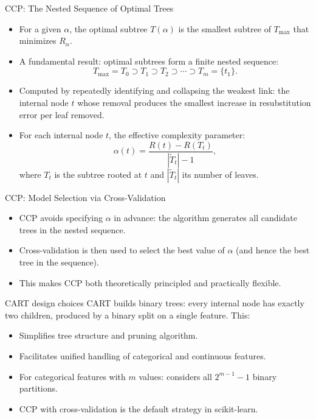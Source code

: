 \begin{frame}{CCP: The Nested Sequence of Optimal Trees}
  \begin{itemize}
    \item For a given $\alpha$, the optimal subtree $T(\alpha)$ is the smallest subtree of
          $T_{\max}$ that minimizes $R_\alpha$.
    \item A fundamental result: optimal subtrees form a finite \alert{nested sequence}:
    \[
      T_{\max} = T_0 \supset T_1 \supset T_2 \supset \cdots \supset T_m = \{t_1\}.
    \]
    \item Computed by repeatedly identifying and collapsing the \alert{weakest link}: the internal
          node $t$ whose removal produces the smallest increase in resubstitution error per leaf removed.
    \item For each internal node $t$, the \alert{effective complexity parameter}:
    \[
      \alpha(t) = \frac{R(t) - R(T_t)}{|\tilde{T}_t| - 1},
    \]
    where $T_t$ is the subtree rooted at $t$ and $|\tilde{T}_t|$ its number of leaves.
  \end{itemize}
\end{frame}

\begin{frame}{CCP: Model Selection via Cross-Validation}
  \begin{itemize}
    \item CCP \alert{avoids specifying $\alpha$ in advance}: the algorithm generates all candidate
          trees in the nested sequence.
    \item \alert{Cross-validation} is then used to select the best value of $\alpha$ (and hence the
          best tree in the sequence).
    \item This makes CCP both \alert{theoretically principled} and \alert{practically flexible}.
  \end{itemize}
  \begin{block}{CART design choices}
    CART builds \alert{binary trees}: every internal node has exactly two children, produced by a
    binary split on a single feature. This:
    \begin{itemize}
      \item Simplifies tree structure and pruning algorithm.
      \item Facilitates unified handling of categorical and continuous features.
      \item For categorical features with $m$ values: considers all $2^{m-1}-1$ binary partitions.
    \end{itemize}
  \end{block}
  \begin{itemize}
    \item CCP with cross-validation is the \alert{default strategy in scikit-learn}.
  \end{itemize}
\end{frame}

